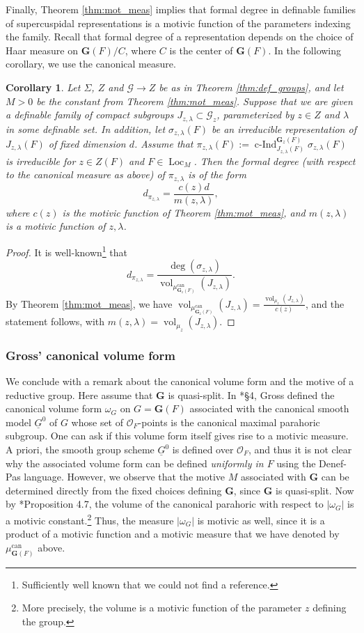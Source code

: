 \documentclass{amsart}
\newcommand{\cG}{\mathcal{G}}
\newcommand{\ri}{\mathcal{O}}
\DeclareMathOperator{\vol}{vol}
\DeclareMathOperator{\loc}{Loc}
\DeclareMathOperator{\ind}{c-Ind}
\newcommand{\bG}{\mathbf{G}}
\newcommand{\can}{\mathrm{can}}
\theoremstyle{plain}
\newtheorem{cor}[thm]{Corollary}
\theoremstyle{definition}
\begin{document}
Finally, Theorem \ref{thm:mot_meas} implies that formal degree in definable families of
supercuspidal representations is a motivic function of the parameters indexing the family. 
Recall that formal degree of a representation depends on the choice of Haar measure on 
$\bG(F)/C$, where $C$ is the center of $\bG(F)$. 
In the following corollary, we use the canonical measure. 
 
\begin{cor} Let $\Sigma$, $Z$  and $\cG \to Z$ be as in Theorem \ref{thm:def_groups}, and let $M>0$ be the constant from Theorem \ref{thm:mot_meas}.
Suppose that we are given a definable family of compact subgroups $J_{z, \lambda} \subset \cG_z$,
parameterized by $z \in Z$ and $\lambda$ in some definable set.
In addition, let $\sigma_{z, \lambda}(F)$ be an irreducible representation of $J_{z, \lambda}(F)$ of fixed dimension $d$.
Assume that $\pi_{z,\lambda}(F) := \ind_{J_{z,\lambda}(F)}^{\bG_z(F)} \sigma_{z,\lambda}(F)$
is irreducible for $z \in Z(F)$ and $F \in \loc_M$.
Then the formal degree (with respect to the canonical measure as above) of $\pi_{z, \lambda}$ is of the form 
\[
d_{\pi_{z, \lambda}}=\frac{c(z)d}{m(z, \lambda)},
\]
where $c(z)$ is the motivic function of Theorem \ref{thm:mot_meas}, and $m(z, \lambda)$ is a motivic function of $z, \lambda$. 
\end{cor}
\begin{proof}
It is well-known\footnote{Sufficiently well known that we could not find a reference.} that
\[
d_{\pi_{z, \lambda}}=\frac{\deg(\sigma_{z, \lambda})}{\vol_{\mu_{\bG_z(F)}^\can}(J_{z, \lambda})}.
\]
By Theorem \ref{thm:mot_meas}, we have 
$\vol_{\mu_{\bG_z(F)}^\can}(J_{z, \lambda}) = \frac{\vol_{\mu_z}(J_{z, \lambda})}{c(z)}$,
and the statement follows, with $m(z, \lambda)=\vol_{\mu_z}(J_{z, \lambda})$.
\end{proof}

\subsubsection{Gross' canonical volume form}
We conclude with a remark about the canonical volume form and the motive of a reductive group. 
Here assume that $\bG$ is quasi-split. In  \cite{gross:motive}*{\S 4}, Gross defined the canonical volume form
$\omega_G$ on $G=\bG(F)$ associated with the canonical smooth model 
$\underline{G}^0$ of $G$ whose set of $\ri_F$-points is the canonical maximal parahoric subgroup. 
One can ask if this volume form itself gives rise to a motivic measure. 
A priori, the smooth group scheme $\underline{G}^0$ is defined over $\ri_F$, and thus it is not clear why the
associated volume form can be defined \emph{uniformly in $F$} using the Denef-Pas language.
However, we observe that the motive $M$ associated with $\bG$ can be determined directly from the fixed choices defining $\bG$,
since $\bG$ is quasi-split.
Now by \cite{gross:motive}*{Proposition 4.7}, the volume of the canonical parahoric with respect to $|\omega_G|$
is a motivic constant.\footnote{More precisely, the volume is a motivic function of the parameter $z$ defining the group.}  
Thus, the measure $|\omega_G|$ is motivic as well, since it is a product of a motivic function
and a motivic measure that we have denoted by $\mu_{\bG(F)}^\can$ above. 


\begin{bibdiv}
\begin{biblist}
\end{biblist}
\end{bibdiv}
\end{document}
